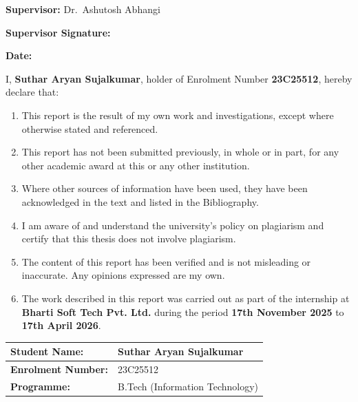 \documentclass[
  12pt,
  a4paperpaper,
]{report}
\begin{document}
\vspace{8pt}

\noindent\textbf{Supervisor:} Dr.~Ashutosh Abhangi

\noindent
\begin{minipage}[t]{0.55\textwidth}
\textbf{Supervisor Signature:} \underline{\hspace{2.0in}}
\end{minipage}\hfill
\begin{minipage}[t]{0.4\textwidth}
\textbf{Date:} \underline{\hspace{1.5in}}
\end{minipage}

\vspace*{\fill}
\clearpage
\vspace*{\fill}
\label{declaration-of-originality}
\vspace{12pt}


I, \textbf{Suthar Aryan Sujalkumar}, holder of Enrolment Number
\textbf{23C25512}, hereby declare that:

\begin{enumerate}
\def\labelenumi{\arabic{enumi}.}
\item
  This report is the result of my own work and investigations, except
  where otherwise stated and referenced.
\item
  This report has not been submitted previously, in whole or in part,
  for any other academic award at this or any other institution.
\item
  Where other sources of information have been used, they have been
  acknowledged in the text and listed in the Bibliography.
\item
  I am aware of and understand the university's policy on plagiarism and
  certify that this thesis does not involve plagiarism.
\item
  The content of this report has been verified and is not misleading or
  inaccurate. Any opinions expressed are my own.
\item
  The work described in this report was carried out as part of the
  internship at \textbf{Bharti Soft Tech Pvt. Ltd.} during the period
  \textbf{17th November 2025} to \textbf{17th April 2026}.
\end{enumerate}


\noindent\begin{tabularx}{\textwidth}{|p{5cm}|X|}
\hline
\textbf{Student Name:}     & Suthar Aryan Sujalkumar \\[3pt]
\hline
\textbf{Enrolment Number:} & 23C25512 \\[3pt]
\hline
\textbf{Programme:}        & B.Tech (Information Technology) \\
\hline
\end{tabularx}
\end{document}

